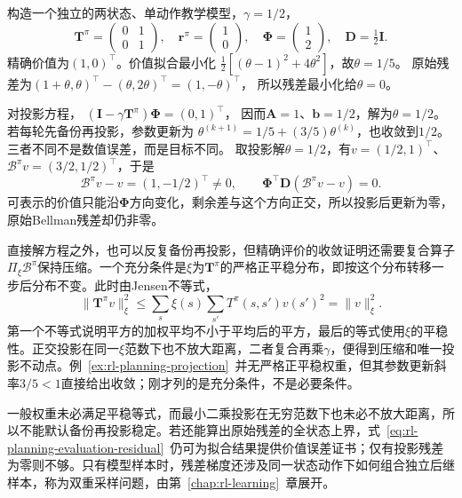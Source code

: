 \begin{example}[同一特征的三种答案]
 \label{ex:rl-planning-projection}
 构造一个独立的两状态、单动作教学模型，$\gamma=1/2$，
 \[
 \bm T^\pi=\begin{pmatrix}0&1\\0&1\end{pmatrix},\quad
 \bm r^\pi=\begin{pmatrix}1\\0\end{pmatrix},\quad
 \bm\Phi=\begin{pmatrix}1\\2\end{pmatrix},\quad
 \bm D=\tfrac12\bm I.
 \]
 精确价值为$(1,0)^\top$。价值拟合最小化
 $\tfrac12[(\theta-1)^2+4\theta^2]$，故$\theta=1/5$。
 原始残差为$(1+\theta,\theta)^\top-(\theta,2\theta)^\top=(1,-\theta)^\top$，
 所以残差最小化给$\theta=0$。

 对投影方程，
 $(\bm I-\gamma\bm T^\pi)\bm\Phi=(0,1)^\top$，
 因而$\bm A=1$、$\bm b=1/2$，解为$\theta=1/2$。
 若每轮先备份再投影，参数更新为
 $\theta^{(k+1)}=1/5+(3/5)\theta^{(k)}$，也收敛到$1/2$。
 三者不同不是数值误差，而是目标不同。
 取投影解$\theta=1/2$，有$v=(1/2,1)^\top$、$\mathcal B^\pi v=(3/2,1/2)^\top$，于是
 \[
   \mathcal B^\pi v-v=(1,-1/2)^\top\ne0,\qquad
   \bm\Phi^\top\bm D(\mathcal B^\pi v-v)=0.
 \]
 可表示的价值只能沿$\bm\Phi$方向变化，剩余差与这个方向正交，所以投影后更新为零，原始Bellman残差却仍非零。

\end{example}

直接解方程之外，也可以反复备份再投影，但精确评价的收敛证明还需要复合算子$\Pi_\xi \mathcal B^\pi$保持压缩。一个充分条件是$\xi$为$\bm T^\pi$的严格正平稳分布，即按这个分布转移一步后分布不变。此时由Jensen不等式，
\[
 \lVert\bm T^\pi v\rVert_\xi^2
 \leq\sum_s\xi(s)\sum_{s'}T^\pi(s,s')v(s')^2
 =\lVert v\rVert_\xi^2.
\]
第一个不等式说明平方的加权平均不小于平均后的平方，最后的等式使用$\xi$的平稳性。正交投影在同一$\xi$范数下也不放大距离，二者复合再乘$\gamma$，便得到压缩和唯一投影不动点。例~\ref{ex:rl-planning-projection}~并无严格正平稳权重，但其参数更新斜率$3/5<1$直接给出收敛；刚才列的是充分条件，不是必要条件。

一般权重未必满足平稳等式，而最小二乘投影在无穷范数下也未必不放大距离，所以不能默认备份再投影稳定。若还能算出原始残差的全状态上界，式~\eqref{eq:rl-planning-evaluation-residual}~仍可为拟合结果提供价值误差证书；仅有投影残差为零则不够。只有模型样本时，残差梯度还涉及同一状态动作下如何组合独立后继样本，称为双重采样问题，由第~\ref{chap:rl-learning}~章展开。

